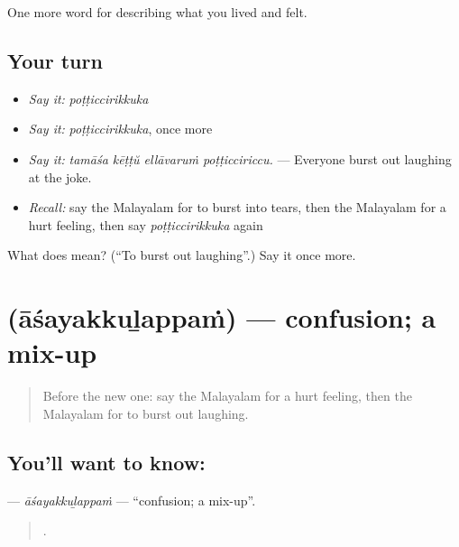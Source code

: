 \begin{grammarlens}[title={What you've built}]
One more word for describing what you lived and felt.
\end{grammarlens}

\subsection*{Your turn}
\begin{itemize}
\raggedright
  \item \emph{Say it:} \emph{poṭṭiccirikkuka}
  \item \emph{Say it:} \emph{poṭṭiccirikkuka}, once more
  \item \emph{Say it:} \emph{tamāśa kēṭṭŭ ellāvaruṁ poṭṭicciriccu.} — Everyone burst out laughing at the joke.
  \item \emph{Recall:} say the Malayalam for to burst into tears, then the Malayalam for a hurt feeling, then say \emph{poṭṭiccirikkuka} again
\end{itemize}

\begin{tcolorbox}[breakable,colback=teal!4,colframe=teal!35!black,title={Before you move on}]
What does  mean? (\textquotedblleft{}To burst out laughing\textquotedblright{}.) Say it once more.
\end{tcolorbox}
\section[\texorpdfstring{\ml{ആശയക്കുഴപ്പം} (āśayakkuḻappaṁ)}{ആശയക്കുഴപ്പം (āśayakkuḻappaṁ)}]{ (āśayakkuḻappaṁ) — confusion; a mix-up}

\label{lesson:ML-C525-asayakkulappam}



\begin{quote}
Before the new one: say the Malayalam for a hurt feeling, then the Malayalam for to burst out laughing.
\end{quote}

\subsection*{You'll want to know: }
\textbf{} — \emph{āśayakkuḻappaṁ} — \textquotedblleft{}confusion; a mix-up\textquotedblright{}.

\begin{quote}
     .
\end{quote}

